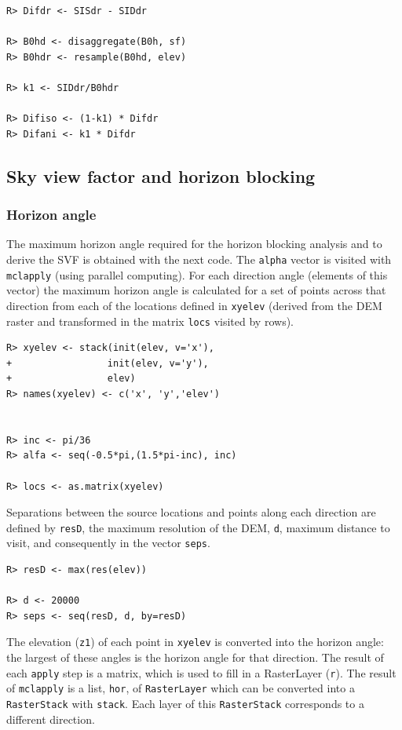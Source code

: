 \documentclass[11pt, english]{article}
\begin{document}
\lstset{language=R,numbers=none}
\begin{lstlisting} 
R> Difdr <- SISdr - SIDdr

R> B0hd <- disaggregate(B0h, sf)
R> B0hdr <- resample(B0hd, elev)

R> k1 <- SIDdr/B0hdr

R> Difiso <- (1-k1) * Difdr
R> Difani <- k1 * Difdr
\end{lstlisting}


\subsection{Sky view factor and horizon blocking}
\label{sec-1-5}

\subsubsection{Horizon angle}
\label{sec-1-5-1}

The maximum horizon angle required for the horizon blocking analysis
and to derive the SVF is obtained with the next code.  The
\texttt{alpha} vector is visited with \texttt{mclapply} (using
parallel computing). For each direction angle (elements of this
vector) the maximum horizon angle is calculated for a set of points
across that direction from each of the locations defined in
\texttt{xyelev} (derived from the DEM raster and transformed in the
matrix \texttt{locs} visited by rows).

\lstset{language=R,numbers=none}
\begin{lstlisting} 
R> xyelev <- stack(init(elev, v='x'),
+                 init(elev, v='y'),
+                 elev)
R> names(xyelev) <- c('x', 'y','elev')


R> inc <- pi/36
R> alfa <- seq(-0.5*pi,(1.5*pi-inc), inc)

R> locs <- as.matrix(xyelev)
\end{lstlisting}

Separations between the source locations and points along each
direction are defined by \texttt{resD}, the maximum resolution of the
DEM, \texttt{d}, maximum distance to visit, and consequently in the
vector \texttt{seps}.

\lstset{language=R,numbers=none}
\begin{lstlisting} 
R> resD <- max(res(elev))

R> d <- 20000
R> seps <- seq(resD, d, by=resD)
\end{lstlisting}

The elevation (\texttt{z1}) of each point in \texttt{xyelev} is
converted into the horizon angle: the largest of these angles is the
horizon angle for that direction. The result of each \texttt{apply}
step is a matrix, which is used to fill in a RasterLayer
(\texttt{r}). The result of \texttt{mclapply} is a list, \texttt{hor},
of \texttt{RasterLayer} which can be converted into a
\texttt{RasterStack} with \texttt{stack}. Each layer of this
\texttt{RasterStack} corresponds to a different direction.
\end{document}
